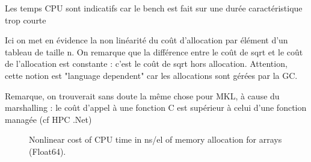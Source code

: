\newpage


Les temps CPU sont indicatifs car le bench est fait sur une durée caractéristique trop courte


Ici on met en évidence la non linéarité du coût d'allocation par élément d'un tableau de taille n.
On remarque que la différence entre le coût de sqrt et le coût de l'allocation est constante : c'est le coût de sqrt 
hors allocation. Attention, cette notion est "language dependent" car les allocations sont gérées par la GC.



Remarque, on trouverait sans doute la même chose pour MKL, à cause du marshalling : le coût d'appel à une fonction C est supérieur à celui d'une fonction managée (cf HPC .Net)

\newpage


\begin{figure}[h]
\begin{center}
\end{center}
\caption{Nonlinear cost of CPU time in ns/el of memory allocation for arrays (Float64).}
\end{figure}





